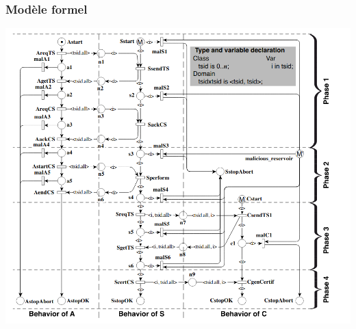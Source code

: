 \documentclass[french]{beamer}
\begin{document}
\begin{frame}
  \frametitle{Modèle formel}
  
  \begin{center}
  \includegraphics[scale=0.25]{PR1.png}
  \end{center}
\end{frame}
\end{document}
